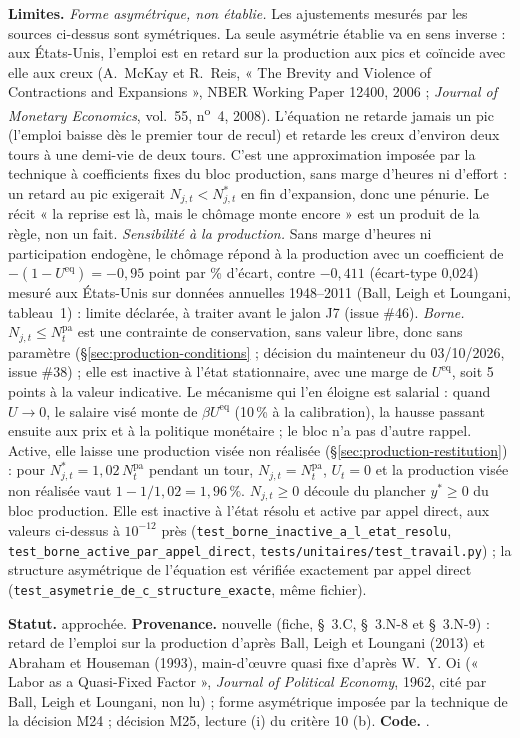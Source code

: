 \documentclass[11pt,a4paper]{article}
\newcommand{\limites}{\par\noindent\textbf{Limites.} }
\newcommand{\code}[1]{\texttt{\detokenize{#1}}}
\newcommand{\tracabilite}[3]{\par\smallskip\noindent\textbf{Statut.} #1. \textbf{Provenance.} #2. \textbf{Code.} \code{#3}.}
\begin{document}
\begin{lecture}
\limites \emph{Forme asymétrique, non établie.} Les ajustements mesurés par les sources ci-dessus sont symétriques. La seule asymétrie établie va en sens inverse : aux États-Unis, l'emploi est en retard sur la production aux pics et coïncide avec elle aux creux (A.~McKay et R.~Reis, « The Brevity and Violence of Contractions and Expansions », NBER Working Paper 12400, 2006 ; \emph{Journal of Monetary Economics}, vol.~55, n\textsuperscript{o}~4, 2008). L'équation ne retarde jamais un pic (l'emploi baisse dès le premier tour de recul) et retarde les creux d'environ deux tours à une demi-vie de deux tours. C'est une approximation imposée par la technique à coefficients fixes du bloc production, sans marge d'heures ni d'effort : un retard au pic exigerait $N_{j,t} < N^{\ast}_{j,t}$ en fin d'expansion, donc une pénurie. Le récit « la reprise est là, mais le chômage monte encore » est un produit de la règle, non un fait. \emph{Sensibilité à la production.} Sans marge d'heures ni participation endogène, le chômage répond à la production avec un coefficient de $-(1 - U^{\mathrm{eq}}) = -0{,}95$ point par \% d'écart, contre $-0{,}411$ (écart-type 0,024) mesuré aux États-Unis sur données annuelles 1948--2011 (Ball, Leigh et Loungani, tableau~1) : limite déclarée, à traiter avant le jalon J7 (issue \#46). \emph{Borne.} $N_{j,t} \le N^{\mathrm{pa}}_t$ est une contrainte de conservation, sans valeur libre, donc sans paramètre (\S\ref{sec:production-conditions} ; décision du mainteneur du 03/10/2026, issue \#38) ; elle est inactive à l'état stationnaire, avec une marge de $U^{\mathrm{eq}}$, soit 5 points à la valeur indicative. Le mécanisme qui l'en éloigne est salarial : quand $U \to 0$, le salaire visé monte de $\beta U^{\mathrm{eq}}$ (10\,\% à la calibration), la hausse passant ensuite aux prix et à la politique monétaire ; le bloc n'a pas d'autre rappel. Active, elle laisse une production visée non réalisée (\S\ref{sec:production-restitution}) : pour $N^{\ast}_{j,t} = 1{,}02\,N^{\mathrm{pa}}_t$ pendant un tour, $N_{j,t} = N^{\mathrm{pa}}_t$, $U_t = 0$ et la production visée non réalisée vaut $1 - 1/1{,}02 = 1{,}96\,\%$. $N_{j,t} \ge 0$ découle du plancher $y^{\ast} \ge 0$ du bloc production. Elle est inactive à l'état résolu et active par appel direct, aux valeurs ci-dessus à $10^{-12}$ près (\nolinkurl{test_borne_inactive_a_l_etat_resolu}, \nolinkurl{test_borne_active_par_appel_direct}, \nolinkurl{tests/unitaires/test_travail.py}) ; la structure asymétrique de l'équation est vérifiée exactement par appel direct (\nolinkurl{test_asymetrie_de_c_structure_exacte}, même fichier).
\tracabilite{approchée}{nouvelle (fiche, \S~3.C, \S~3.N-8 et \S~3.N-9) : retard de l'emploi sur la production d'après Ball, Leigh et Loungani (2013) et Abraham et Houseman (1993), main-d'œuvre quasi fixe d'après W.~Y. Oi (« Labor as a Quasi-Fixed Factor », \emph{Journal of Political Economy}, 1962, cité par Ball, Leigh et Loungani, non lu) ; forme asymétrique imposée par la technique de la décision M24 ; décision M25, lecture (i) du critère 10 (b)}{nations.blocs.travail.emploi}
\end{lecture}
\end{document}
